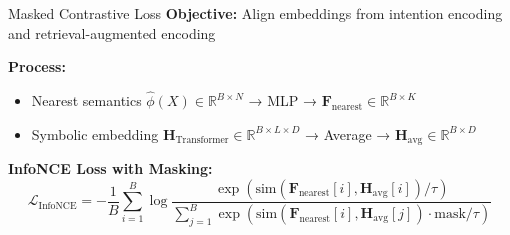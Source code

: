 \documentclass[aspectratio=1610]{beamer}
\begin{document}
    \begin{frame}{Masked Contrastive Loss}
        \textbf{Objective:} Align embeddings from intention encoding and retrieval-augmented encoding

        \vspace{0.2cm}
        \textbf{Process:}
        \begin{itemize}
            \item Nearest semantics $\hat{\phi}(X) \in \mathbb{R}^{B \times N}$ → MLP → $\mathbf{F}_{\text{nearest}} \in \mathbb{R}^{B \times K}$
            \item Symbolic embedding $\mathbf{H}_{\text{Transformer}} \in \mathbb{R}^{B \times L \times D}$ → Average → $\mathbf{H}_{\text{avg}} \in \mathbb{R}^{B \times D}$
        \end{itemize}

        \vspace{0.2cm}
        \textbf{InfoNCE Loss with Masking:}
        \begin{equation}
            \mathcal{L}_{\text{InfoNCE}} = - \frac{1}{B} \sum_{i=1}^{B} \log \frac{\exp\left(\text{sim}(\mathbf{F}_{\text{nearest}}[i], \mathbf{H}_{\text{avg}}[i]) / \tau\right)}{\sum_{j=1}^{B} \exp\left(\text{sim}(\mathbf{F}_{\text{nearest}}[i], \mathbf{H}_{\text{avg}}[j]) \cdot \text{mask} / \tau\right)}
        \end{equation}


    \end{frame}
\end{document}
